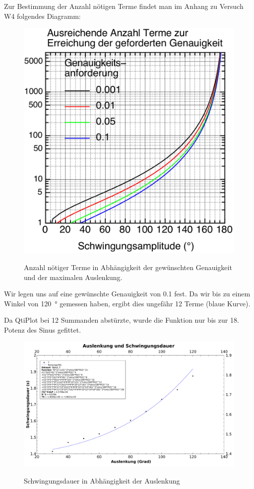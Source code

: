 Zur Bestimmung der Anzahl n\"otigen Terme findet man im Anhang zu Versuch W4 folgendes
Diagramm:
\begin{figure}[h!]
    \centering
    \includegraphics[width=.67\textwidth]{images/w4terme.png}
    \label{fig:w4terme}
    \caption{%
        Anzahl n\"otiger Terme in Abh\"angigkeit der gew\"unschten Genauigkeit
        und der maximalen Auslenkung.
    }
\end{figure}

Wir legen uns auf eine gew\"unschte Genauigkeit von \num{0.1} fest. Da wir bis
zu einem Winkel  von \SI{120}{\degree} gemessen haben,  ergibt dies ungef\"ahr
12 Terme (blaue Kurve).

Da  QtiPlot bei  12  Summanden abst\"urzte,  wurde die  Funktion  nur bis  zur
18. Potenz des Sinus gefittet.

\begin{figure}[h!]
    \centering
    \includegraphics[width=\textwidth]{images/313.pdf}
    \label{fig:pendelKonfigs}
    \caption{%
        Schwingungsdauer in Abh\"angigkeit der Auslenkung
    }
\end{figure}

